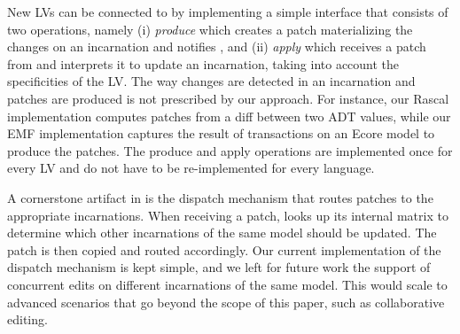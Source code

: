New LVs can be connected to \prism by implementing a simple interface that consists of two operations, namely (i) \emph{produce} which creates a patch materializing the changes on an incarnation and notifies \prism, and (ii) \emph{apply} which receives a patch from \prism and interprets it to update an incarnation, taking into account the specificities of the LV.
The way changes are detected in an incarnation and patches are produced is not prescribed by our approach.
For instance, our Rascal implementation computes patches from a diff between two ADT values, while our EMF implementation captures the result of transactions on an Ecore model to produce the patches.
The produce and apply operations are implemented once for every LV and do not have to be re-implemented for every language.

A cornerstone artifact in \prism is the dispatch mechanism that routes patches to the appropriate incarnations.
When receiving a patch, \prism looks up its internal matrix to determine which other incarnations of the same model should be updated.
The patch is then copied and routed accordingly.
Our current implementation of the dispatch mechanism is kept simple, and we left for future work the support of concurrent edits on different incarnations of the same model. This would scale \prism to advanced scenarios that go beyond the scope of this paper, such as collaborative editing.

